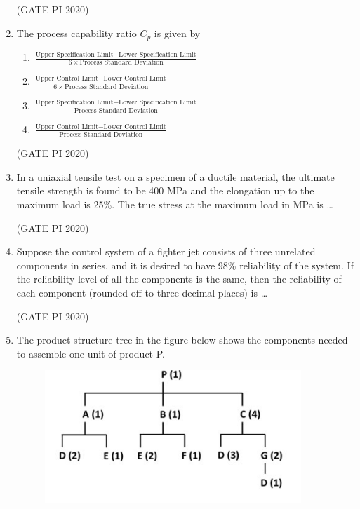 \documentclass[journal,12pt,onecolumn]{IEEEtran}
\theoremstyle{remark}
\begin{document}
\begin{enumerate}
\hfill (GATE PI 2020)

\item The process capability ratio $C_p$ is given by 

\begin{enumerate}
\setlength{\itemsep}{1em}
\item $\frac{\text{Upper Specification Limit} - \text{Lower Specification Limit}}{6 \times \text{Process Standard Deviation}}$
\item $\frac{\text{Upper Control Limit} - \text{Lower Control Limit}}{6 \times \text{Process Standard Deviation}}$
\item $\frac{\text{Upper Specification Limit} - \text{Lower Specification Limit}}{\text{Process Standard Deviation}}$
\item $\frac{\text{Upper Control Limit} - \text{Lower Control Limit}}{\text{Process Standard Deviation}}$
\end{enumerate}

\hfill (GATE PI 2020)

\item In a uniaxial tensile test on a specimen of a ductile material, the ultimate tensile strength is found to be 400 MPa and the elongation up to the maximum load is 25\%. The true stress at the maximum load in MPa is \dots

\hfill (GATE PI 2020)

\item Suppose the control system of a fighter jet consists of three unrelated components in series, and it is desired to have 98\% reliability of the system. If the reliability level of all the components is the same, then the reliability of each component (rounded off to three decimal places) is \dots

\hfill (GATE PI 2020)

\item The product structure tree in the figure below shows the components needed to assemble one unit of product P.

\begin{figure}[H]
    \centering
    \includegraphics[width=0.5\columnwidth]{figs/fig10.png}
    \caption{}
    \label{fig:placeholder}
\end{figure}


\end{enumerate}
\end{document}
